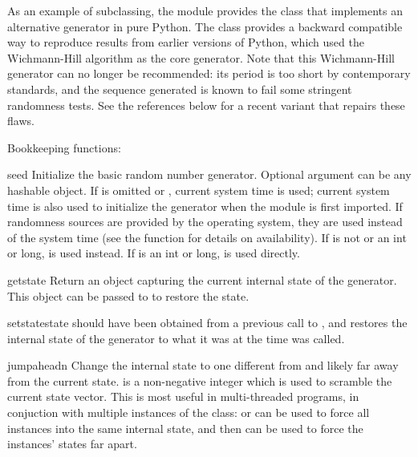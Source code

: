 As an example of subclassing, the  module provides
the  class that implements an alternative generator
in pure Python.  The class provides a backward compatible way to
reproduce results from earlier versions of Python, which used the
Wichmann-Hill algorithm as the core generator.  Note that this Wichmann-Hill
generator can no longer be recommended:  its period is too short by
contemporary standards, and the sequence generated is known to fail some
stringent randomness tests.  See the references below for a recent
variant that repairs these flaws.


Bookkeeping functions:

\begin{funcdesc}{seed}{}
  Initialize the basic random number generator.
  Optional argument  can be any hashable object.
  If  is omitted or , current system time is used;
  current system time is also used to initialize the generator when the
  module is first imported.  If randomness sources are provided by the
  operating system, they are used instead of the system time (see the
  function for details on availability).  
  If  is not  or an int or long,
   is used instead.
  If  is an int or long,  is used directly.
\end{funcdesc}

\begin{funcdesc}{getstate}{}
  Return an object capturing the current internal state of the
  generator.  This object can be passed to  to
  restore the state.
\end{funcdesc}

\begin{funcdesc}{setstate}{state}
   should have been obtained from a previous call to
  , and  restores the
  internal state of the generator to what it was at the time
   was called.
\end{funcdesc}

\begin{funcdesc}{jumpahead}{n}
  Change the internal state to one different from and likely far away from
  the current state.   is a non-negative integer which is used to
  scramble the current state vector.  This is most useful in multi-threaded
  programs, in conjuction with multiple instances of the 
  class:  or  can be used to force all
  instances into the same internal state, and then 
  can be used to force the instances' states far apart.
 \end{funcdesc}

